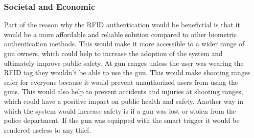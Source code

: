 \subsubsection{Societal and Economic}

Part of the reason why the RFID authentication would be benefictial is that it would be a more affordable and reliable solution compared to other biometric authentication methods. 
This would make it more accessible to a wider range of gun owners, which could help to increase the adoption of the system and ultimately improve public safety. At gun ranges unless
the user was wearing the RFID tag they wouldn't be able to use the gun. This would make shooting ranges safer for everyone because it would prevent unauthorized users from using the guns.
This would also help to prevent accidents and injuries at shooting ranges, which could have a positive impact on public health and safety. Another way in which the system
would increase safety is if a gun was lost or stolen from the police department. If the gun was equipped with the smart trigger it would be rendered useless to any thief.




